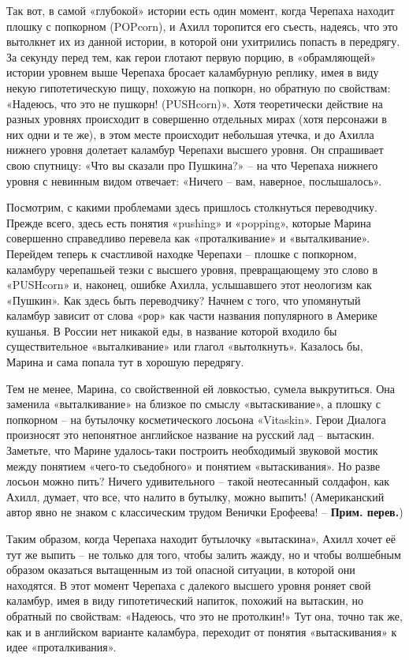 \documentclass[../main.tex]{subfiles}
\begin{document}
Так вот, в самой «глубокой» истории есть один момент, когда Черепаха находит плошку с попкорном (POPcorn), и Ахилл торопится его съесть, надеясь, что это вытолкнет их из данной истории, в которой они ухитрились попасть в передрягу. За секунду перед тем, как герои глотают первую порцию, в «обрамляющей» истории уровнем выше Черепаха бросает каламбурную реплику, имея в виду некую гипотетическую пищу, похожую на попкорн, но обратную по свойствам: «Надеюсь, что это не пушкорн! (PUSHcorn)». Хотя теоретически действие на разных уровнях происходит в совершенно отдельных мирах (хотя персонажи в них одни и те же), в этом месте происходит небольшая утечка, и до Ахилла нижнего уровня долетает каламбур Черепахи высшего уровня. Он спрашивает свою спутницу: «Что вы сказали про Пушкина?» \--- на что Черепаха нижнего уровня с невинным видом отвечает: «Ничего \--- вам, наверное, послышалось».

Посмотрим, с какими проблемами здесь пришлось столкнуться переводчику. Прежде всего, здесь есть понятия «pushing» и «popping», которые Марина совершенно справедливо перевела как «проталкивание» и «выталкивание». Перейдем теперь к счастливой находке Черепахи \--- плошке с попкорном, каламбуру черепашьей тезки с высшего уровня, превращающему это слово в «PUSHcorn» и, наконец, ошибке Ахилла, услышавшего этот неологизм как «Пушкин». Как здесь быть переводчику? Начнем с того, что упомянутый каламбур зависит от слова «рор» как части названия популярного в Америке кушанья. В России нет никакой еды, в название которой входило бы существительное «выталкивание» или глагол «вытолкнуть». Казалось бы, Марина и сама попала тут в хорошую передрягу.

Тем не менее, Марина, со свойственной ей ловкостью, сумела выкрутиться. Она заменила «выталкивание» на близкое по смыслу «вытаскивание», а плошку с попкорном \--- на бутылочку косметического лосьона «Vitaskin». Герои Диалога произносят это непонятное английское название на русский лад \--- вытаскин. Заметьте, что Марине удалось-таки построить необходимый звуковой мостик между понятием «чего-то съедобного» и понятием «вытаскивания». Но разве лосьон можно пить? Ничего удивительного \--- такой неотесанный солдафон, как Ахилл, думает, что все, что налито в бутылку, можно выпить! (Американский автор явно не знаком с классическим трудом Венички Ерофеева! \--- \textbf{Прим. перев.})

Таким образом, когда Черепаха находит бутылочку «вытаскина», Ахилл хочет её тут же выпить \--- не только для того, чтобы залить жажду, но и чтобы волшебным образом оказаться вытащенным из той опасной ситуации, в которой они находятся. В этот момент Черепаха с далекого высшего уровня роняет свой каламбур, имея в виду гипотетический напиток, похожий на вытаскин, но обратный по свойствам: «Надеюсь, что это не протолкин!» Тут она, точно так же, как и в английском варианте каламбура, переходит от понятия «вытаскивания» к идее «проталкивания».
\end{document}
